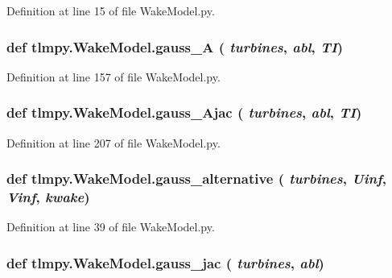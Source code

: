 Definition at line 15 of file WakeModel.py.\hypertarget{namespacetlmpy_1_1WakeModel_a0e0f3fa2bc51f34fb52d4ccdd5938c1f}{
\subsubsection[{gauss\_\-A}]{\setlength{\rightskip}{0pt plus 5cm}def tlmpy.WakeModel.gauss\_\-A ( {\em turbines}, \/   {\em abl}, \/   {\em TI})}}
\label{namespacetlmpy_1_1WakeModel_a0e0f3fa2bc51f34fb52d4ccdd5938c1f}


Definition at line 157 of file WakeModel.py.\hypertarget{namespacetlmpy_1_1WakeModel_a5bbdfca77ef1eaf8f780a053296a15b9}{
\subsubsection[{gauss\_\-Ajac}]{\setlength{\rightskip}{0pt plus 5cm}def tlmpy.WakeModel.gauss\_\-Ajac ( {\em turbines}, \/   {\em abl}, \/   {\em TI})}}
\label{namespacetlmpy_1_1WakeModel_a5bbdfca77ef1eaf8f780a053296a15b9}


Definition at line 207 of file WakeModel.py.\hypertarget{namespacetlmpy_1_1WakeModel_aca85906fb572f3126366fc36d0540ba5}{
\subsubsection[{gauss\_\-alternative}]{\setlength{\rightskip}{0pt plus 5cm}def tlmpy.WakeModel.gauss\_\-alternative ( {\em turbines}, \/   {\em Uinf}, \/   {\em Vinf}, \/   {\em kwake})}}
\label{namespacetlmpy_1_1WakeModel_aca85906fb572f3126366fc36d0540ba5}


Definition at line 39 of file WakeModel.py.\hypertarget{namespacetlmpy_1_1WakeModel_a77013f552afb8bb8df4ed6a2faf76f47}{
\subsubsection[{gauss\_\-jac}]{\setlength{\rightskip}{0pt plus 5cm}def tlmpy.WakeModel.gauss\_\-jac ( {\em turbines}, \/   {\em abl})}}
\label{namespacetlmpy_1_1WakeModel_a77013f552afb8bb8df4ed6a2faf76f47}


